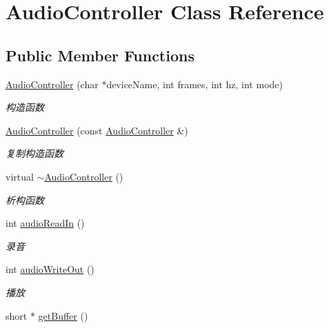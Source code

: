 \hypertarget{classAudioController}{\section{\-Audio\-Controller \-Class \-Reference}
\label{classAudioController}
}
\subsection*{\-Public \-Member \-Functions}
\begin{DoxyCompactItemize}
\item 
\hyperlink{classAudioController_aae9107432bac4c1343a8ef4c43810b26}{\-Audio\-Controller} (char $\ast$device\-Name, int frames, int hz, int mode)
\begin{DoxyCompactList}\small\item\em 构造函数 \end{DoxyCompactList}\item 
\hypertarget{classAudioController_a84769d1c3e7fa4739e8967d37510f5e3}{\hyperlink{classAudioController_a84769d1c3e7fa4739e8967d37510f5e3}{\-Audio\-Controller} (const \hyperlink{classAudioController}{\-Audio\-Controller} \&)}\label{classAudioController_a84769d1c3e7fa4739e8967d37510f5e3}

\begin{DoxyCompactList}\small\item\em 复制构造函数 \end{DoxyCompactList}\item 
virtual \hyperlink{classAudioController_aa0a806374cdeb9328683b368261ca7ab}{$\sim$\-Audio\-Controller} ()
\begin{DoxyCompactList}\small\item\em 析构函数 \end{DoxyCompactList}\item 
int \hyperlink{classAudioController_a6e7d094660d78edfd74535232fe32e65}{audio\-Read\-In} ()
\begin{DoxyCompactList}\small\item\em 录音 \end{DoxyCompactList}\item 
int \hyperlink{classAudioController_af9ebb304d0f85aa595e97cd44de8dcae}{audio\-Write\-Out} ()
\begin{DoxyCompactList}\small\item\em 播放 \end{DoxyCompactList}\item 
\hypertarget{classAudioController_a858c0b9cebc797b0a9e5aa518deaa0c1}{short $\ast$ \hyperlink{classAudioController_a858c0b9cebc797b0a9e5aa518deaa0c1}{get\-Buffer} ()}\label{classAudioController_a858c0b9cebc797b0a9e5aa518deaa0c1}


\end{DoxyCompactItemize}
